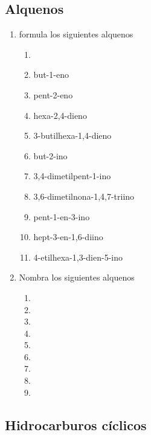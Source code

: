 \subsection*{Alquenos}
\begin{enumerate}
    \item formula los siguientes alquenos
          \begin{enumerate}
              \item
              \item but-1-eno
              \item pent-2-eno
              \item hexa-2,4-dieno
              \item 3-butilhexa-1,4-dieno
              \item but-2-ino
              \item 3,4-dimetilpent-1-ino
              \item 3,6-dimetilnona-1,4,7-triino
              \item pent-1-en-3-ino
              \item hept-3-en-1,6-diino
              \item 4-etilhexa-1,3-dien-5-ino
          \end{enumerate}
    \item Nombra los siguientes alquenos
          \begin{enumerate}
              \item {}
              \item {}
              \item {}
              \item {}
              \item {}
              \item {}
              \item {}
              \item {}
              \item {}
          \end{enumerate}
\end{enumerate}

\subsection*{Hidrocarburos cíclicos}


